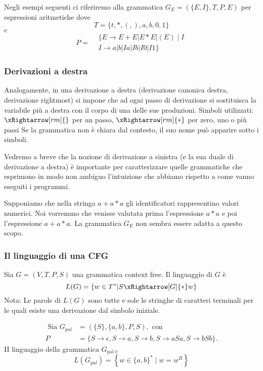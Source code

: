 Negli esempi seguenti ci riferiremo alla grammatica $G_{E}=(\{E, I\}, T, P, E)$ per espressioni aritmetiche dove
$$
T=\{t, *,(,), a, b, 0,1\}
$$
$e$
$$
P=\begin{aligned}
&\{E \rightarrow E+E|E * E|(E) \mid I \\
&I \rightarrow a|b| Ia| Ib|I0| I1\}
\end{aligned}
$$

\subsubsection{Derivazioni a destra}
Analogamente, in una derivazione a destra (derivazione canonica destra, derivazione rightmost) si impone che ad ogni passo di derivazione si sostituisca la variabile più a destra con il corpo di una delle sue produzioni.
Simboli utilizzati:
$\xRightarrow[rm]{}$ per un passo, $\xRightarrow[rm]{*}$ per zero, uno o più passi
Se la grammatica non è chiara dal contesto, il suo nome può apparire sotto i simboli.

\vspace{5mm}

Vedremo a breve che la nozione di derivazione a sinistra (e la sua duale di derivazione a destra) è importante per caratterizzare quelle grammatiche che esprimono in modo non ambiguo l'intuizione che abbiamo rispetto a come vanno eseguiti i programmi.

Supponiamo che nella stringa $a+a * a$ gli identificatori rappresentino valori numerici. Noi vorremmo che venisse valutata prima l'espressione $a * a$ e poi l'espressione $a+a * a$. La grammatica $G_{E}$ non sembra essere adatta a questo scopo.

\subsubsection{Il linguaggio di una CFG}
Sia $G=(V, T, P, S)$ una grammatica context free.
Il linguaggio di $G$ è
$$
L(G)=\{w \in T^{*}|S \xRightarrow[G]{*} w\}
$$
Nota: Le parole di $L(G)$ sono tutte e sole le stringhe di caratteri terminali per le quali esiste una derivazione dal simbolo iniziale.

\vspace{5mm}

$$
\begin{aligned}
\text { Sia } G_{p a l} &=(\{S\},\{a, b\}, P, S), \text { con } \\
P &=\{S \rightarrow \epsilon, S \rightarrow a, S \rightarrow b, S \rightarrow a S a, S \rightarrow b S b\} .
\end{aligned}
$$
II linguaggio della grammatica $G_{\text {pal è }}$
$$
L\left(G_{p a l}\right)=\left\{w \in\{a, b\}^{*} \mid w=w^{R}\right\}
$$

